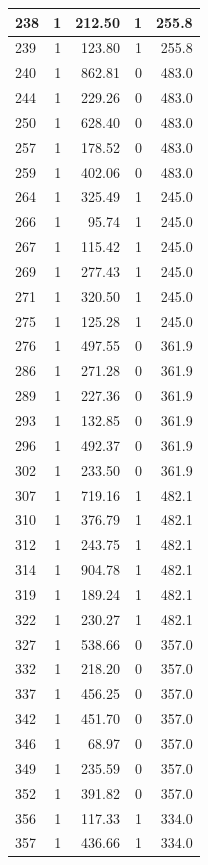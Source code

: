 \documentclass[
  spanish,
  12pt,
]{book}
\begin{document}
\begin{tabular}{l|r|r|r|r}
\hline
238 & 1 & 212.50 & 1 & 255.8\\
\hline
239 & 1 & 123.80 & 1 & 255.8\\
\hline
240 & 1 & 862.81 & 0 & 483.0\\
\hline
244 & 1 & 229.26 & 0 & 483.0\\
\hline
250 & 1 & 628.40 & 0 & 483.0\\
\hline
257 & 1 & 178.52 & 0 & 483.0\\
\hline
259 & 1 & 402.06 & 0 & 483.0\\
\hline
264 & 1 & 325.49 & 1 & 245.0\\
\hline
266 & 1 & 95.74 & 1 & 245.0\\
\hline
267 & 1 & 115.42 & 1 & 245.0\\
\hline
269 & 1 & 277.43 & 1 & 245.0\\
\hline
271 & 1 & 320.50 & 1 & 245.0\\
\hline
275 & 1 & 125.28 & 1 & 245.0\\
\hline
276 & 1 & 497.55 & 0 & 361.9\\
\hline
286 & 1 & 271.28 & 0 & 361.9\\
\hline
289 & 1 & 227.36 & 0 & 361.9\\
\hline
293 & 1 & 132.85 & 0 & 361.9\\
\hline
296 & 1 & 492.37 & 0 & 361.9\\
\hline
302 & 1 & 233.50 & 0 & 361.9\\
\hline
307 & 1 & 719.16 & 1 & 482.1\\
\hline
310 & 1 & 376.79 & 1 & 482.1\\
\hline
312 & 1 & 243.75 & 1 & 482.1\\
\hline
314 & 1 & 904.78 & 1 & 482.1\\
\hline
319 & 1 & 189.24 & 1 & 482.1\\
\hline
322 & 1 & 230.27 & 1 & 482.1\\
\hline
327 & 1 & 538.66 & 0 & 357.0\\
\hline
332 & 1 & 218.20 & 0 & 357.0\\
\hline
337 & 1 & 456.25 & 0 & 357.0\\
\hline
342 & 1 & 451.70 & 0 & 357.0\\
\hline
346 & 1 & 68.97 & 0 & 357.0\\
\hline
349 & 1 & 235.59 & 0 & 357.0\\
\hline
352 & 1 & 391.82 & 0 & 357.0\\
\hline
356 & 1 & 117.33 & 1 & 334.0\\
\hline
357 & 1 & 436.66 & 1 & 334.0\\

\end{tabular}
\end{document}
